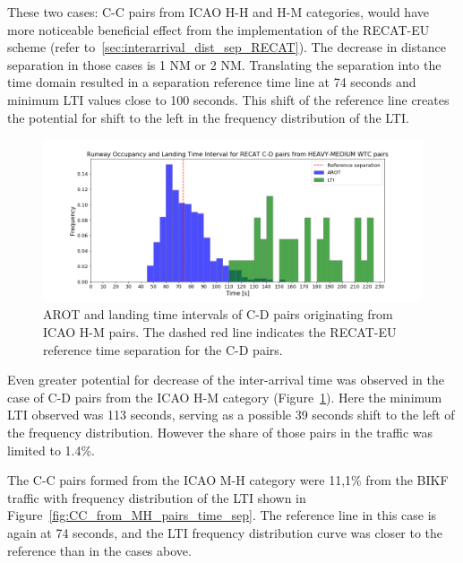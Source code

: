 These two cases: C-C pairs from ICAO H-H and H-M categories, would have more noticeable beneficial effect from the implementation of the RECAT-EU scheme (refer to~\ref{sec:interarrival_dist_sep_RECAT}). The decrease in distance separation in those cases is 1 NM or 2 NM. Translating the separation into the time domain resulted in a separation reference time line at 74 seconds and minimum LTI values close to 100 seconds. This shift of the reference line creates the potential for shift to the left in the frequency distribution of the LTI.
 
 \begin{figure}[h]
    \centering
    \includegraphics[width=1\textwidth]{graphics/fig_CD_from_HM_pairs_time_sep.png}
    \caption[AROT and LTI of C-D pairs originating from ICAO H-M pairs]{AROT and landing time intervals of C-D pairs originating from ICAO H-M pairs. The dashed red line indicates the RECAT-EU reference time separation for the C-D pairs.}
    \label{fig:CD_from_HM_pairs_time_sep}
\end{figure}

Even greater potential for decrease of the inter-arrival time was observed in the case of C-D pairs from the ICAO H-M category (Figure~\ref{fig:CD_from_HM_pairs_time_sep}). Here the minimum LTI observed was 113 seconds, serving as a possible 39 seconds shift to the left of the frequency distribution. However the share of those pairs in the traffic was limited to 1.4\%.

The C-C pairs formed from the ICAO M-H category were 11,1\% from the BIKF traffic with frequency distribution of the LTI shown in Figure~\ref{fig:CC_from_MH_pairs_time_sep}. The reference line in this case is again at 74 seconds, and the LTI frequency distribution curve was closer to the reference than in the cases above.

